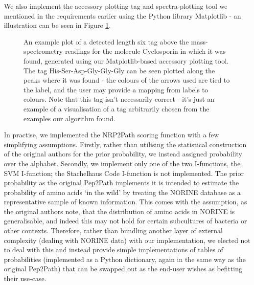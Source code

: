 \documentclass{l4proj}
\newcommand{\cit}[1]{\citep{#1}}
\begin{document}
We also implement the accessory plotting tag and spectra-plotting tool we mentioned in the requirements earlier using the Python library Matplotlib \cit{matplotlib} - an illustration can be seen in Figure \ref{fig:spectragraph}.

\begin{figure} \label{fig:spectragraph}
    \centering

    \caption{An example plot of a detected length six tag above the mass-spectrometry readings for the molecule Cyclosporin in which it was found, generated using our Matplotlib-based accessory plotting tool. The tag His-Ser-Asp-Gly-Gly-Gly can be seen plotted along the peaks where it was found - the colours of the arrows used are tied to the label, and the user may provide a mapping from labels to colours. Note that this tag isn't necessarily correct - it's just an example of a visualisation of a tag arbitrarily chosen from the examples our algorithm found.}

    \label{fig:spectragraph}
\end{figure}

In practise, we implemented the NRP2Path scoring function with a few simplifying assumptions. Firstly, rather than utilising the statistical construction of the original authors for the prior probability, we instead assigned probability over the alphabet. Secondly, we implement only one of the two I-functions, the SVM I-function; the Stachelhaus Code I-function is not implemented. The prior probability as the original Pep2Path implements it is intended to estimate the probability of amino acids `in the wild' by treating the NORINE database as a representative sample of known information. This comes with the assumption, as the original authors note, that the distribution of amino acids in NORINE is generalisable, and indeed this may not hold for certain subcultures of bacteria or other contexts. Therefore, rather than bundling another layer of external complexity (dealing with NORINE data) with our implementation, we elected not to deal with this and instead provide simple implementations of tables of probabilities (implemented as a Python dictionary, again in the same way as the original Pep2Path) that can be swapped out as the end-user wishes as befitting their use-case.
\end{document}
